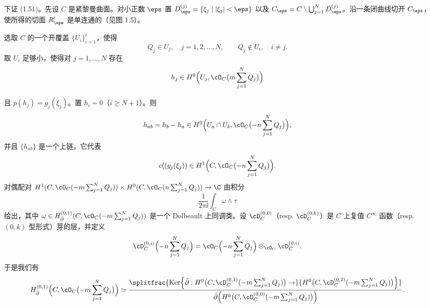 下证 (1.51)。先设 $C$ 是紧黎曼曲面。对小正数 $\eps$ 置 $D_\eps^{(j)}=\{\xi_j\mid |\xi_j|<\eps\}$ 以及 $C_\eps=C\setminus\bigcup_{j=1}^N D_\eps^{(j)}$。沿一条闭曲线切开 $C_\eps$，使所得的切面 $R'_\eps$ 是单连通的（见图 1.5）。

选取 $C$ 的一个开覆盖 $\{U_i\}_{i=1}^t$，使得
\[
Q_j\in U_j,\quad j=1,2,\dots,N,\qquad Q_j\notin U_i,\quad i\ne j .
\]
取 $U_i$ 足够小，使得对 $j=1,\dots,N$ 存在
\[
h_j\in H^0\Bigl(U_j,\cO_C\bigl(m\sum_{j=1}^N Q_j\bigr)\Bigr)
\]

且 $p(h_j)=g_j(\xi_j)$。置 $h_i=0$（$i\ge N+1$）。则
\[
h_{ab}=h_b-h_a\in H^0\Bigl(U_a\cap U_b,\cO_C\bigl(-n\sum_{j=1}^N Q_j\bigr)\Bigr),
\]
并且 $\{h_{ab}\}$ 是一个上链，它代表
\[
c((g_j(\xi_j))\in H^1\Bigl(C,\cO_C\bigl(-n\sum_{j=1}^N Q_j\bigr)\Bigr).
\]
对偶配对 $H^1(C,\cO_C(-m\sum_{j=1}^N Q_j))\times H^0(C,\cO_C(n\sum_{j=1}^N Q_j))\to\C$ 由积分
\[
\frac{1}{2\pi\ii}\int_C\omega\wedge\tau
\]
给出，其中 $\omega\in H^{(0,1)}_{\bar\partial}(C,\cO_C(-m\sum_{j=1}^N Q_j))$ 是一个 Dolbeault 上同调类。设 $\cD_C^{(0,0)}$（resp. $\cD_C^{(0,k)}$）是 $C$ 上复值 $C^\infty$ 函数（resp. $(0,k)$ 型形式）芽的层，并定义
\[
\cD_C^{(0,i)}\Bigl(-n\sum_{j=1}^N Q_j\Bigr)
=\cO_C\Bigl(-n\sum_{j=1}^N Q_j\Bigr)\otimes_{\cO_C}\cD_C^{(0,i)} .
\]
于是我们有
\[
H^{(0,1)}_{\bar\partial}\Bigl(C,\cO_C\bigl(-m\sum_{j=1}^N Q_j\bigr)\Bigr)
\simeq\frac{\splitfrac{\operatorname{Ker}\Bigl\{\bar\partial:H^0\bigl(C,\cD_C^{(0,1)}(-m\sum_{j=1}^N Q_j)\bigr)\to}
{H^0\bigl(C,\cD_C^{(0,2)}(-m\sum_{j=1}^N Q_j)\bigr)\Bigr\}}}
{\bar\partial\Bigl(H^0\bigl(C,\cD_C^{(0,0)}(-m\sum_{j=1}^N Q_j)\bigr)\Bigr)} .
\]



